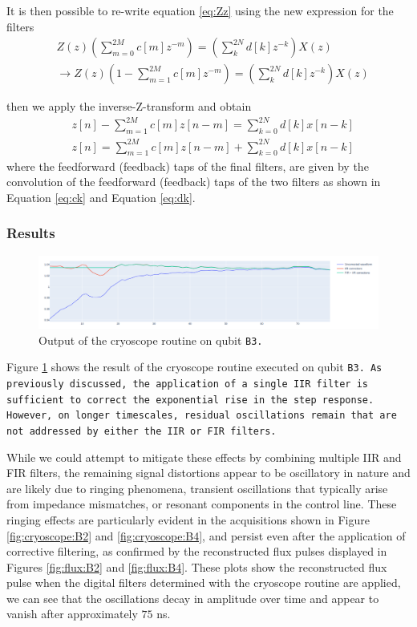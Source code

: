 It is then possible to re-write equation \ref{eq:Zz} using the new expression for the filters
\begin{align}
    & Z(z)\left( \sum_{m=0}^{2M} c[m]z^{-m} \right) = \left( \sum_{k}^{2N} d[k]z^{-k} \right)X(z)\\
    & \rightarrow Z(z)\left(1 - \sum_{m=1}^{2M} c[m]z^{-m} \right) = \left( \sum_{k}^{2N} d[k]z^{-k} \right)X(z) \label{eq:z_final}
\end{align} 

then we apply the inverse-Z-transform and obtain
\begin{align}
    & z[n] - \sum_{m=1}^{2M} c[m]z[n-m] = \sum_{k=0}^{2N} d[k] x[n-k]\\
    & z[n] = \sum_{m=1}^{2M} c[m]z[n-m] + \sum_{k=0}^{2N} d[k] x[n-k]
\end{align}
where the feedforward (feedback) taps of the final filters, are given by the convolution of the feedforward (feedback) taps of the two filters as shown in Equation \ref{eq:ck} and Equation \ref{eq:dk}.

\subsubsection{Results}\label{subsec:cryo_results}

\begin{figure}[h!]
    \centering
    \includegraphics[width=\textwidth]{figures/png/Cryoscope/B3.png}
    \caption{Output of the cryoscope routine on qubit \tt{B3}.}
    \label{fig:cryoscope:B3}
\end{figure} 

Figure \ref{fig:cryoscope:B3} shows the result of the cryoscope routine executed on qubit \tt{B3}. 
As previously discussed, the application of a single IIR filter is sufficient to correct the exponential rise in the step response. 
However, on longer timescales, residual oscillations remain that are not addressed by either the IIR or FIR filters.

While we could attempt to mitigate these effects by combining multiple IIR and FIR filters, the remaining signal distortions appear to be oscillatory in nature and are likely due to ringing phenomena, transient oscillations that typically arise from impedance mismatches, or resonant components in the control line.
These ringing effects are particularly evident in the acquisitions shown in Figure \ref{fig:cryoscope:B2} and \ref{fig:cryoscope:B4}, and persist even after the application of corrective filtering, as confirmed by the reconstructed flux pulses displayed in Figures \ref{fig:flux:B2} and \ref{fig:flux:B4}.
These plots show the reconstructed flux pulse when the digital filters determined with the cryoscope routine are applied, we can see that the oscillations decay in amplitude over time and appear to vanish after approximately $75$ ns. 

